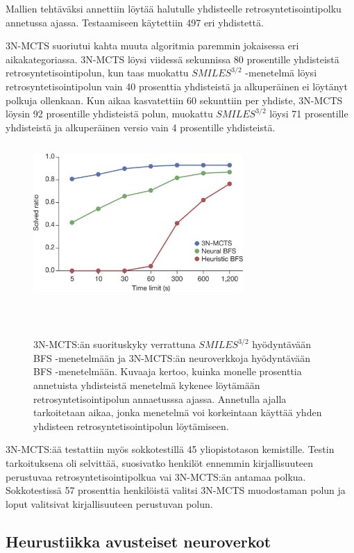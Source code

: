 \documentclass[finnish,twoside,censored,tkt,sw-line]{HYthesisML}
\begin{document}
Mallien tehtäväksi annettiin löytää halutulle yhdisteelle retrosyntetisointipolku annetussa ajassa.
Testaamiseen käytettiin 497 eri yhdistettä.

3N-MCTS suoriutui kahta muuta algoritmia paremmin jokaisessa eri aikakategoriassa.
3N-MCTS löysi viidessä sekunnissa 80 prosentille yhdisteistä retrosyntetisointipolun, kun taas muokattu \(SMILES^{3/2}\) -menetelmä löysi retrosyntetisointipolun vain 40 prosenttia yhdisteistä ja alkuperäinen ei löytänyt polkuja ollenkaan.
Kun aikaa kasvatettiin 60 sekunttiin per yhdiste, 3N-MCTS löysin 92 prosentille yhdisteistä polun, muokattu \(SMILES^{3/2}\) löysi 71 prosentille yhdisteistä ja alkuperäinen versio vain 4 prosentille yhdisteistä.

\begin{figure}
    \centering
    \includegraphics[width=8cm, height=6cm]{3N-MCTS-performance-fig.jpg}
    \caption{
        3N-MCTS:än suorituskyky verrattuna \(SMILES^{3/2}\) hyödyntävään BFS -menetelmään ja 3N-MCTS:än neuroverkkoja hyödyntävään BFS -menetelmään.
        Kuvaaja kertoo, kuinka monelle prosenttia annetuista yhdisteistä menetelmä kykenee löytämään retrosyntetisointipolun annaetusssa ajassa.
        Annetulla ajalla tarkoitetaan aikaa, jonka menetelmä voi korkeintaan käyttää yhden yhdisteen retrosyntetisointipolun löytämiseen.
    }
    {~\cite{SeglerMarwinHS2018Pcsw}}
\end{figure}

3N-MCTS:ää testattiin myös sokkotestillä 45 yliopistotason kemistille.
Testin tarkoituksena oli selvittää, suosivatko henkilöt ennemmin kirjallisuuteen perustuvaa retrosyntetisointipolkua vai 3N-MCTS:än antamaa polkua.
Sokkotestissä 57 prosenttia henkilöistä valitsi 3N-MCTS muodostaman polun ja loput valitsivat kirjallisuuteen perustuvan polun.


\subsection{Heurustiikka avusteiset neuroverkot}
\end{document}
